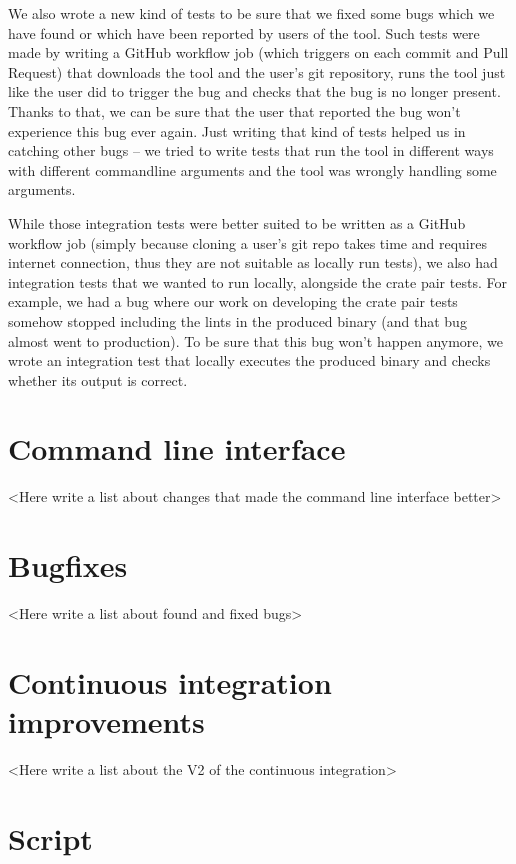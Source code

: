 \documentclass[licencjacka,en]{pracamgr}
\begin{document}
We also wrote a new kind of tests to be sure that we fixed some bugs
which we have found or which have been reported by users of the tool.
Such tests were made by writing a GitHub workflow job (which triggers on each
commit and Pull Request) that downloads the tool and the user's git repository,
runs the tool just like the user did to trigger the bug
and checks that the bug is no longer present.
Thanks to that, we can be sure that the user that reported the bug
won't experience this bug ever again.
Just writing that kind of tests helped us in catching other bugs
-- we tried to write tests that run the tool in different ways
with different commandline arguments and the tool was wrongly handling some arguments.

While those integration tests were better suited to be written as a GitHub workflow job
(simply because cloning a user's git repo takes time and requires internet connection,
thus they are not suitable as locally run tests),
we also had integration tests that we wanted to run locally, alongside the crate pair tests.
For example, we had a bug where our work on developing the crate pair tests somehow
stopped including the lints in the produced binary (and that bug almost went to production).
To be sure that this bug won't happen anymore, we wrote an integration test that
locally executes the produced binary and checks whether its output is correct.

\section{Command line interface}\label{r:section_cli}

<Here write a list about changes that made the command line interface better>

\section{Bugfixes}\label{r:section_bugfixes}

<Here write a list about found and fixed bugs>

\section{Continuous integration improvements}\label{r:section_continuous_integration_improvements}

<Here write a list about the V2 of the continuous integration>

\section{Script}\label{r:section_script_implementation}
\end{document}
